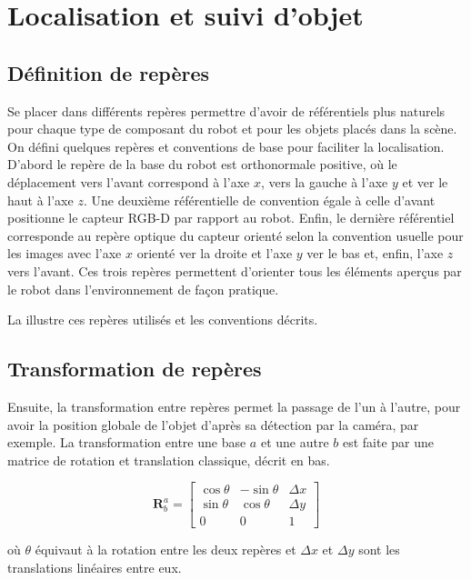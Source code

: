 \section{Localisation et suivi d'objet}

\subsection{Définition de repères}

Se placer dans différents repères permettre d'avoir de référentiels plus naturels pour chaque type de composant du robot et pour les objets placés dans la scène. On défini quelques repères et conventions de base pour faciliter la localisation. D'abord le repère de la base du robot est orthonormale positive, où le déplacement vers l'avant correspond à l'axe $x$, vers la gauche à l'axe $y$ et ver le haut à l'axe $z$. Une deuxième référentielle de convention égale à celle d'avant positionne le capteur RGB-D par rapport au robot. Enfin, le dernière référentiel corresponde au repère optique du capteur orienté selon la convention usuelle pour les images avec l'axe $x$ orienté ver la droite et l'axe $y$ ver le bas et, enfin, l'axe $z$ vers l'avant. Ces trois repères permettent d'orienter tous les éléments aperçus par le robot dans l'environnement de façon pratique.

La  illustre ces repères utilisés et les conventions décrits.

\subsection{Transformation de repères}

Ensuite, la transformation entre repères permet la passage de l'un à l'autre, pour avoir la position globale de l'objet d'après sa détection par la caméra, par exemple. La transformation entre une base $a$ et une autre $b$ est faite par une matrice de rotation et translation classique, décrit en bas. 

\begin{equation*}
	\mathbf{R}^{a}_{b} = 
	\begin{bmatrix} 
	 	\cos \theta &  -\sin \theta & \Delta x \\ \sin \theta & \cos \theta & \Delta y \\ 0 & 0 & 1
	 \end{bmatrix}
\end{equation*}

où $\theta$ équivaut à la rotation entre les deux repères et $\Delta x$ et $\Delta y$ sont les translations linéaires entre eux.


